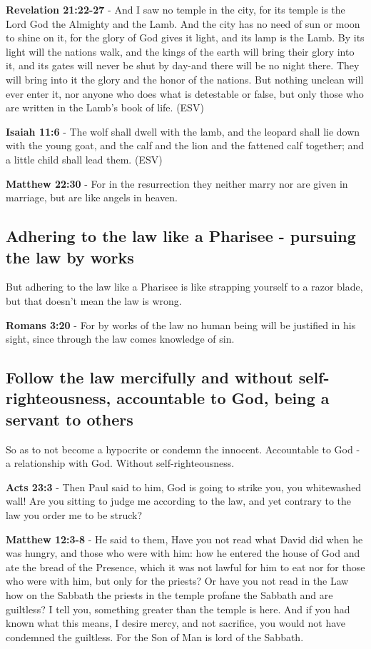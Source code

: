 \documentclass[11pt]{article}
\begin{document}
\textbf{Revelation 21:22-27} - And I saw no temple in the city, for its temple is the Lord God the Almighty and the Lamb. And the city has no need of sun or moon to shine on it, for the glory of God gives it light, and its lamp is the Lamb. By its light will the nations walk, and the kings of the earth will bring their glory into it, and its gates will never be shut by day-and there will be no night there. They will bring into it the glory and the honor of the nations. But nothing unclean will ever enter it, nor anyone who does what is detestable or false, but only those who are written in the Lamb's book of life. (ESV)

\textbf{Isaiah 11:6} - The wolf shall dwell with the lamb, and the leopard shall lie down with the young goat, and the calf and the lion and the fattened calf together; and a little child shall lead them. (ESV)

\textbf{Matthew 22:30} - For in the resurrection they neither marry nor are given in marriage, but are like angels in heaven.

\subsection{Adhering to the law like a Pharisee - pursuing the law by works}
\label{sec:org381b291}
But adhering to the law like a Pharisee is like strapping yourself to a razor blade, but that doesn't mean the law is wrong.

\textbf{Romans 3:20} - For by works of the law no human being will be justified in his sight, since through the law comes knowledge of sin.

\subsection{Follow the law mercifully and without self-righteousness, accountable to God, being a servant to others}
\label{sec:orgf1e6b1c}
So as to not become a hypocrite or condemn the innocent.
Accountable to God - a relationship with God.
Without self-righteousness.

\textbf{Acts 23:3} - Then Paul said to him, God is going to strike you, you whitewashed wall! Are you sitting to judge me according to the law, and yet contrary to the law you order me to be struck?

\textbf{Matthew 12:3-8} - He said to them, Have you not read what David did when he was hungry, and those who were with him: how he entered the house of God and ate the bread of the Presence, which it was not lawful for him to eat nor for those who were with him, but only for the priests? Or have you not read in the Law how on the Sabbath the priests in the temple profane the Sabbath and are guiltless? I tell you, something greater than the temple is here. And if you had known what this means, I desire mercy, and not sacrifice, you would not have condemned the guiltless. For the Son of Man is lord of the Sabbath.
\end{document}
